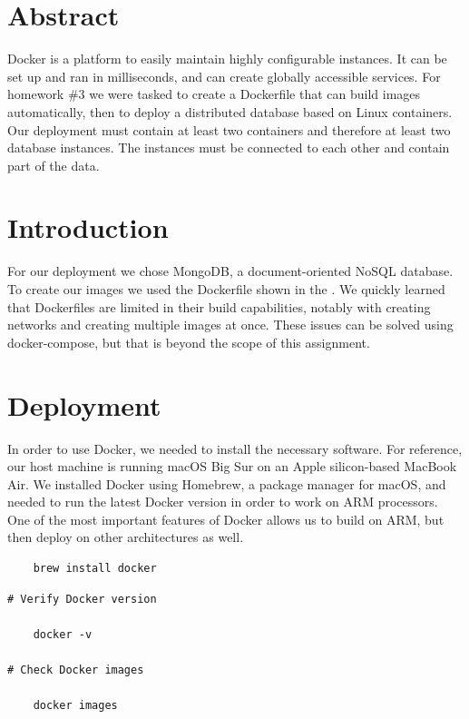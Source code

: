 \documentclass{article}
\begin{document}
\hypersetup{
    linkcolor=CrispBlue,
    urlcolor=CrispBlue,
    breaklinks=true
}
\section{Abstract}
Docker is a platform to easily maintain highly configurable instances. It can be set up and ran in milliseconds, and can create globally accessible services. For homework \#3 we were tasked to create a Dockerfile that can build images automatically, then to deploy a distributed database based on Linux containers. Our deployment must contain at least two containers and therefore at least two database instances. The instances must be connected to each other and contain part of the data.


\section{Introduction}
For our deployment we chose MongoDB, a document-oriented NoSQL database. To create our images we used the Dockerfile shown in the . We quickly learned that Dockerfiles are limited in their build capabilities, notably with creating networks and creating multiple images at once. These issues can be solved using docker-compose, but that is beyond the scope of this assignment.






\section{Deployment}
In order to use Docker, we needed to install the necessary software. For reference, our host machine is running macOS Big Sur on an Apple silicon-based MacBook Air. We installed Docker using Homebrew, a package manager for macOS, and needed to run the latest Docker version in order to work on ARM processors. One of the most important features of Docker allows us to build on ARM, but then deploy on other architectures as well.

\begin{tcolorbox}[colback=CrispBlue!5!white,colframe=CrispBlue!75!black,title=Install Docker via Homebrew]
\begin{verbatim}
    brew install docker
\end{verbatim}
\end{tcolorbox}

\begin{tcolorbox}[colback=CrispBlue!5!white,colframe=CrispBlue!75!black,title=Docker verification]
\begin{verbatim}
# Verify Docker version

    docker -v

# Check Docker images

    docker images
\end{verbatim}
\end{tcolorbox}
\end{document}
